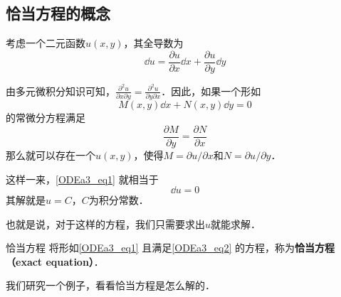 

\subsection{恰当方程的概念}

考虑一个二元函数$u(x, y)$，其全导数为
\begin{equation}
\dd u=\frac{\partial u}{\partial x}\dd x+\frac{\partial u}{\partial y}\dd y
\end{equation}

由多元微积分知识可知，$\frac{\partial^2 u}{\partial x\partial y}=\frac{\partial^2 u}{\partial y\partial x}$．因此，如果一个形如
\begin{equation}\label{ODEa3_eq1}
M(x, y)\dd x+N(x, y)\dd y=0
\end{equation}
的常微分方程满足
\begin{equation}\label{ODEa3_eq2}
\frac{\partial M}{\partial y}=\frac{\partial N}{\partial x}
\end{equation}
那么就可以存在一个$u(x, y)$，使得$M=\partial u/\partial x$和$N=\partial u/\partial y$．

这样一来，\autoref{ODEa3_eq1} 就相当于
\begin{equation}
\dd u=0
\end{equation}
其解就是$u=C$，$C$为积分常数．

也就是说，对于这样的方程，我们只需要求出$u$就能求解．

\begin{definition}{恰当方程}
将形如\autoref{ODEa3_eq1} 且满足\autoref{ODEa3_eq2} 的方程，称为\textbf{恰当方程（exact equation）}．
\end{definition}

我们研究一个例子，看看恰当方程是怎么解的．

